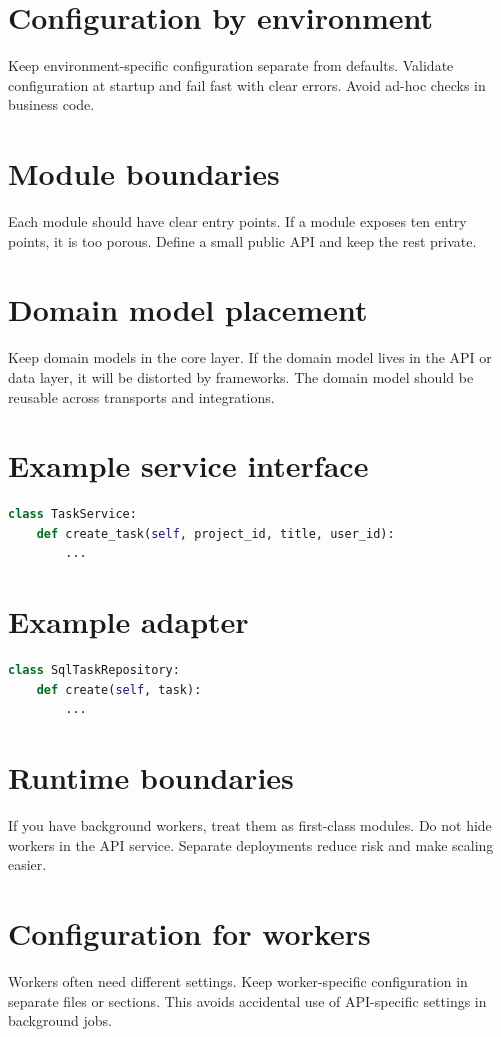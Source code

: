 \section{Configuration by environment}
Keep environment-specific configuration separate from defaults.
Validate configuration at startup and fail fast with clear errors.
Avoid ad-hoc  checks in business code.

\section{Module boundaries}
Each module should have clear entry points.
If a module exposes ten entry points, it is too porous.
Define a small public API and keep the rest private.

\section{Domain model placement}
Keep domain models in the core layer.
If the domain model lives in the API or data layer, it will be distorted by frameworks.
The domain model should be reusable across transports and integrations.

\section{Example service interface}
\begin{lstlisting}[language=Python]
class TaskService:
    def create_task(self, project_id, title, user_id):
        ...
\end{lstlisting}

\section{Example adapter}
\begin{lstlisting}[language=Python]
class SqlTaskRepository:
    def create(self, task):
        ...
\end{lstlisting}

\section{Runtime boundaries}
If you have background workers, treat them as first-class modules.
Do not hide workers in the API service.
Separate deployments reduce risk and make scaling easier.

\section{Configuration for workers}
Workers often need different settings.
Keep worker-specific configuration in separate files or sections.
This avoids accidental use of API-specific settings in background jobs.

